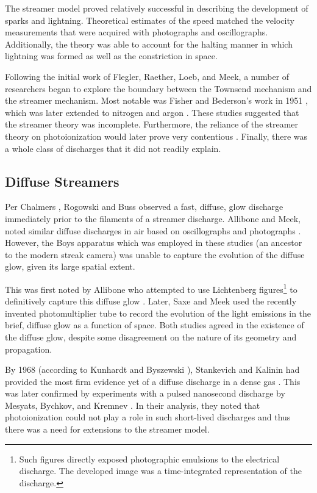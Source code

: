 The streamer model proved relatively successful in describing the development of
sparks and lightning. Theoretical estimates of the speed matched the velocity
measurements that were acquired with photographs and oscillographs.
Additionally, the theory was able to account for the halting manner in which
lightning was formed as well as the constriction in space.

Following the initial work of Flegler, Raether, Loeb, and Meek, a number of
researchers began to explore the boundary between the Townsend mechanism and the
streamer mechanism. Most notable was Fisher and Bederson's work in 1951
\cite{Fisher1951}, which was later extended to nitrogen \cite{Kachickas1952} and
argon \cite{Kachickas1953}. These studies suggested that the streamer theory was
incomplete. Furthermore, the reliance of the streamer theory on photoionization
would later prove very contentious \cite{Kunhardt1988}. Finally, there was a
whole class of discharges that it did not readily explain.

\subsection{Diffuse Streamers}

Per Chalmers \cite{Chalmers1971}, Rogowski and Buss \cite{Rogowski1927,
Buss1932} observed a fast, diffuse, glow discharge immediately prior to the
filaments of a streamer discharge. Allibone and Meek, noted similar diffuse
discharges in air based on oscillographs and photographs \cite{Allibone1938,
Allibone1938b, Allibone1938c}. However, the Boys apparatus which was employed in
these studies (an ancestor to the modern streak camera) was unable to capture
the evolution of the diffuse glow, given its large spatial extent.

This was first noted by Allibone who attempted to use Lichtenberg
figures\footnote{Such figures directly exposed photographic emulsions to the
electrical discharge. The developed image was a time-integrated representation
of the discharge.} to definitively capture this diffuse glow
\cite{Allibone1948}. Later, Saxe and Meek used the recently invented
photomultiplier tube to record the evolution of the light emissions in the
brief, diffuse glow \cite{Saxe1948} as a function of space. Both studies
agreed in the existence of the diffuse glow, despite some disagreement on the
nature of its geometry and propagation.

By 1968 (according to Kunhardt and Byszewski \cite{Kunhardt1980}), Stankevich
and Kalinin had provided the most firm evidence yet of a diffuse discharge in a
dense gas \cite{Stankevich1968}. This was later confirmed by experiments with a
pulsed nanosecond discharge by Mesyats, Bychkov, and Kremnev \cite{Mesyats1972}.
In their analysis, they noted that photoionization could not play a role in such
short-lived discharges and thus there was a need for extensions to the streamer
model.

